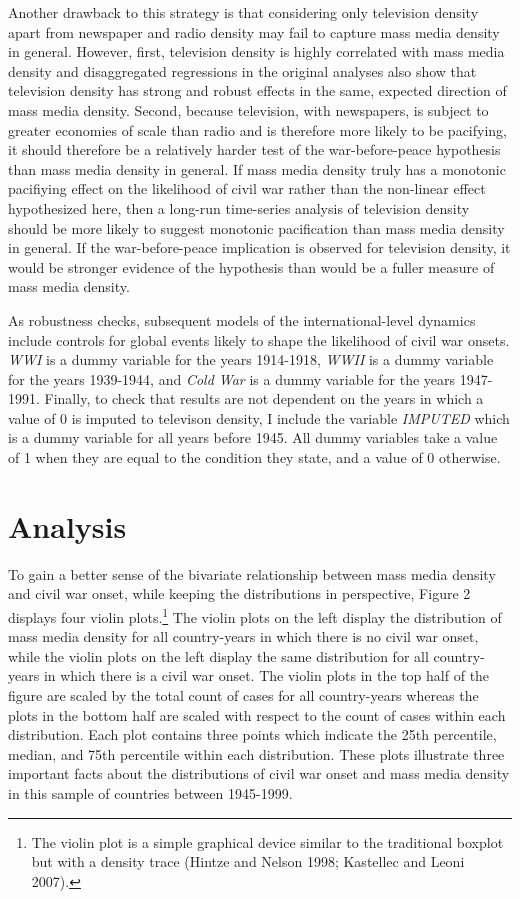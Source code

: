 \documentclass[11pt,article,oneside]{memoir}
\begin{document}
Another drawback to this strategy is that considering only television
density apart from newspaper and radio density may fail to capture mass
media density in general. However, first, television density is highly
correlated with mass media density and disaggregated regressions in the
original analyses also show that television density has strong and
robust effects in the same, expected direction of mass media density.
Second, because television, with newspapers, is subject to greater
economies of scale than radio and is therefore more likely to be
pacifying, it should therefore be a relatively harder test of the
war-before-peace hypothesis than mass media density in general. If mass
media density truly has a monotonic pacifiying effect on the likelihood
of civil war rather than the non-linear effect hypothesized here, then a
long-run time-series analysis of television density should be more
likely to suggest monotonic pacification than mass media density in
general. If the war-before-peace implication is observed for television
density, it would be stronger evidence of the hypothesis than would be a
fuller measure of mass media density.

As robustness checks, subsequent models of the international-level
dynamics include controls for global events likely to shape the
likelihood of civil war onsets. \emph{WWI} is a dummy variable for the
years 1914-1918, \emph{WWII} is a dummy variable for the years
1939-1944, and \emph{Cold War} is a dummy variable for the years
1947-1991. Finally, to check that results are not dependent on the years
in which a value of 0 is imputed to televison density, I include the
variable \emph{IMPUTED} which is a dummy variable for all years before
1945. All dummy variables take a value of 1 when they are equal to the
condition they state, and a value of 0 otherwise.

\section{Analysis}\label{analysis}

To gain a better sense of the bivariate relationship between mass media
density and civil war onset, while keeping the distributions in
perspective, Figure 2 displays four violin plots.\footnote{The violin
  plot is a simple graphical device similar to the traditional boxplot
  but with a density trace (Hintze and Nelson 1998; Kastellec and Leoni
  2007).} The violin plots on the left display the distribution of mass
media density for all country-years in which there is no civil war
onset, while the violin plots on the left display the same distribution
for all country-years in which there is a civil war onset. The violin
plots in the top half of the figure are scaled by the total count of
cases for all country-years whereas the plots in the bottom half are
scaled with respect to the count of cases within each distribution. Each
plot contains three points which indicate the 25th percentile, median,
and 75th percentile within each distribution. These plots illustrate
three important facts about the distributions of civil war onset and
mass media density in this sample of countries between 1945-1999.
\end{document}
